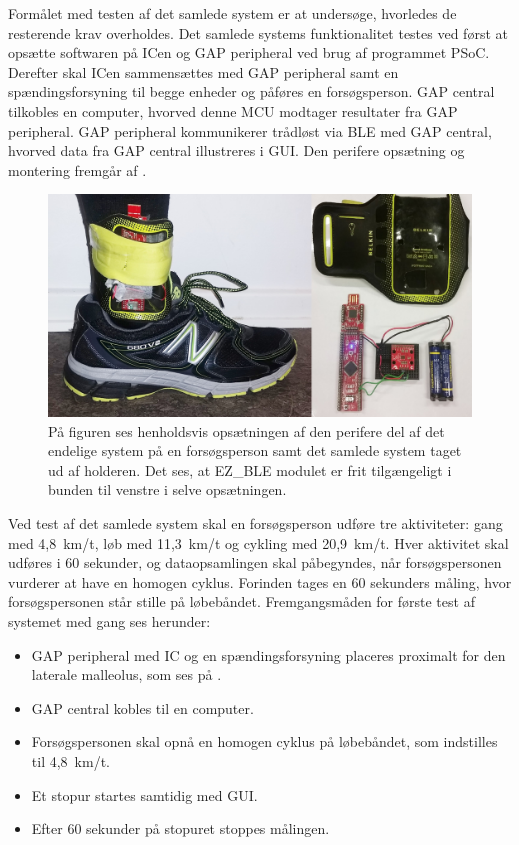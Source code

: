 Formålet med testen af det samlede system er at undersøge, hvorledes de resterende krav overholdes. Det samlede systems funktionalitet testes ved først at opsætte softwaren på ICen og GAP peripheral ved brug af programmet PSoC. Derefter skal ICen sammensættes med GAP peripheral samt en spændingsforsyning til begge enheder og påføres en forsøgsperson. GAP central tilkobles en computer, hvorved denne MCU modtager resultater fra GAP peripheral. GAP peripheral kommunikerer trådløst via BLE med GAP central, hvorved data fra GAP central illustreres i GUI. Den perifere opsætning og montering fremgår af .
\begin{figure}[H]
	\centering
	\includegraphics[scale=0.143]{figures/cDesign/samlet_system_paafod4.jpg}
	\caption{På figuren ses henholdsvis opsætningen af den perifere del af det endelige system på en forsøgsperson samt det samlede system taget ud af holderen. Det ses, at EZ\_BLE modulet er frit tilgængeligt i bunden til venstre i selve opsætningen.}
	\label{fig:samlede_system_opstilling}
\end{figure}\vspace{-.25cm}
Ved test af det samlede system skal en forsøgsperson udføre tre aktiviteter: gang med 4,8~km/t, løb med 11,3~km/t og cykling med 20,9~km/t. Hver aktivitet skal udføres i 60 sekunder, og dataopsamlingen skal påbegyndes, når forsøgspersonen vurderer at have en homogen cyklus. Forinden tages en 60 sekunders måling, hvor forsøgspersonen står stille på løbebåndet. Fremgangsmåden for første test af systemet med gang ses herunder: 
\begin{itemize}
\item GAP peripheral med IC og en spændingsforsyning placeres proximalt for den laterale malleolus, som ses på .
\item GAP central kobles til en computer.
\item Forsøgspersonen skal opnå en homogen cyklus på løbebåndet, som indstilles til 4,8~km/t. 
\item Et stopur startes samtidig med GUI.
\item Efter 60 sekunder på stopuret stoppes målingen.
\end{itemize}
